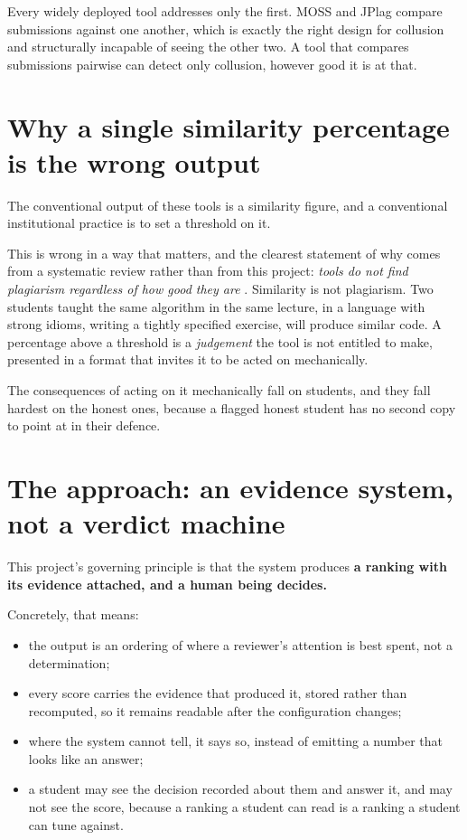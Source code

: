 Every widely deployed tool addresses only the first. MOSS and JPlag
compare submissions against one another, which is exactly the right
design for collusion and structurally incapable of seeing the other two.
A tool that compares submissions pairwise can detect only collusion,
however good it is at that.

\hypertarget{why-a-single-similarity-percentage-is-the-wrong-output}{%
\section{Why a single similarity percentage is the wrong
output}\label{why-a-single-similarity-percentage-is-the-wrong-output}}

The conventional output of these tools is a similarity figure, and a
conventional institutional practice is to set a threshold on it.

This is wrong in a way that matters, and the clearest statement of why
comes from a systematic review rather than from this project:
\emph{tools do not find plagiarism regardless of how good they are}
\cite{novak2019}. Similarity is not plagiarism. Two students taught the
same algorithm in the same lecture, in a language with strong idioms,
writing a tightly specified exercise, will produce similar code. A
percentage above a threshold is a \emph{judgement} the tool is not
entitled to make, presented in a format that invites it to be acted on
mechanically.

The consequences of acting on it mechanically fall on students, and they
fall hardest on the honest ones, because a flagged honest student has no
second copy to point at in their defence.

\hypertarget{the-approach-an-evidence-system-not-a-verdict-machine}{%
\section{The approach: an evidence system, not a verdict
machine}\label{the-approach-an-evidence-system-not-a-verdict-machine}}

This project's governing principle is that the system produces \textbf{a
ranking with its evidence attached, and a human being decides.}

Concretely, that means:

\begin{itemize}
\tightlist
\item
  the output is an ordering of where a reviewer's attention is best
  spent, not a determination;
\item
  every score carries the evidence that produced it, stored rather than
  recomputed, so it remains readable after the configuration changes;
\item
  where the system cannot tell, it says so, instead of emitting a number
  that looks like an answer;
\item
  a student may see the decision recorded about them and answer it, and
  may not see the score, because a ranking a student can read is a
  ranking a student can tune against.
\end{itemize}

